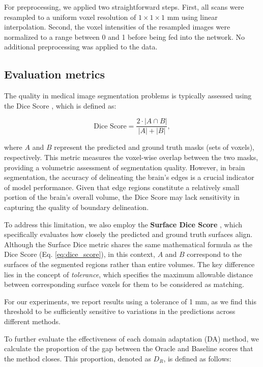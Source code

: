 For preprocessing, we applied two straightforward steps. First, all scans were resampled to a uniform voxel resolution of $1 \times 1 \times 1$ mm using linear interpolation. Second, the voxel intensities of the resampled images were normalized to a range between 0 and 1 before being fed into the network. No additional preprocessing was applied to the data.


\subsection{Evaluation metrics}

The quality in medical image segmentation problems is typically assessed using the Dice Score \cite{bakas2018identifying}, which is defined as:

\begin{equation}
	\label{eq:dice_score}
	\text{Dice Score} = \frac{2 \cdot |A \cap B|}{|A| + |B|},
\end{equation}

\noindent
where $A$ and $B$ represent the predicted and ground truth masks (sets of voxels), respectively. This metric measures the voxel-wise overlap between the two masks, providing a volumetric assessment of segmentation quality. However, in brain segmentation, the accuracy of delineating the brain's edges is a crucial indicator of model performance. Given that edge regions constitute a relatively small portion of the brain's overall volume, the Dice Score may lack sensitivity in capturing the quality of boundary delineation.

To address this limitation, we also employ the \textbf{Surface Dice Score} \cite{nikolov2021clinically}, which specifically evaluates how closely the predicted and ground truth surfaces align. Although the Surface Dice metric shares the same mathematical formula as the Dice Score (Eq. \ref{eq:dice_score}), in this context, $A$ and $B$ correspond to the surfaces of the segmented regions rather than entire volumes. The key difference lies in the concept of \textit{tolerance}, which specifies the maximum allowable distance between corresponding surface voxels for them to be considered as matching.


For our experiments, we report results using a tolerance of 1 mm, as we find this threshold to be sufficiently sensitive to variations in the predictions across different methods.

To further evaluate the effectiveness of each domain adaptation (DA) method, we calculate the proportion of the gap between the Oracle and Baseline scores that the method closes. This proportion, denoted as $D_R$, is defined as follows:

